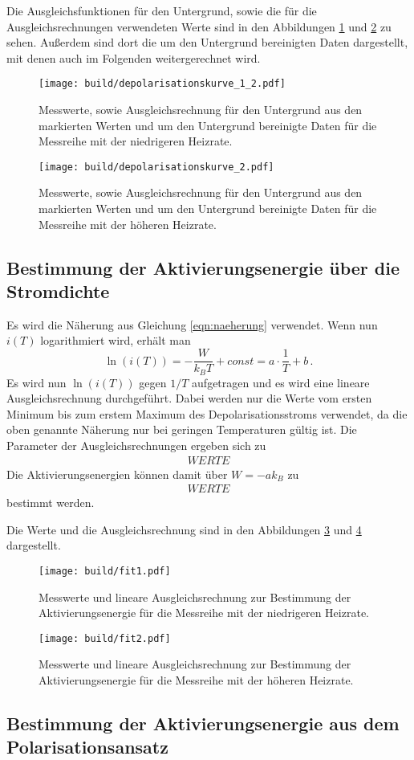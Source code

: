 Die Ausgleichsfunktionen für den Untergrund, sowie die für die Ausgleichsrechnungen
verwendeten Werte sind in den Abbildungen \ref{fig:depol1} und \ref{fig:depol2} zu sehen.
Außerdem sind dort die um den Untergrund bereinigten Daten dargestellt, mit denen auch
im Folgenden weitergerechnet wird.

\begin{figure}
  \centering
  \texttt{[image: build/depolarisationskurve\_1\_2.pdf]}
  \caption{Messwerte, sowie Ausgleichsrechnung für den Untergrund aus den markierten Werten
  und um den Untergrund bereinigte Daten für die Messreihe mit der niedrigeren Heizrate.}
  \label{fig:depol1}
\end{figure}
\begin{figure}
  \centering
  \texttt{[image: build/depolarisationskurve\_2.pdf]}
  \caption{Messwerte, sowie Ausgleichsrechnung für den Untergrund aus den markierten Werten
  und um den Untergrund bereinigte Daten für die Messreihe mit der höheren Heizrate.}
  \label{fig:depol2}
\end{figure}

\subsection{Bestimmung der Aktivierungsenergie über die Stromdichte}

Es wird die Näherung aus Gleichung \eqref{eqn:naeherung} verwendet. Wenn nun $i(T)$
logarithmiert wird, erhält man
\begin{equation*}
  \ln(i(T))=-\frac{W}{k_B T} + const =a\cdot \frac{1}{T} +b  \,.
\end{equation*}
Es wird nun $\ln(i(T))$ gegen $1/T$ aufgetragen und es wird eine lineare Ausgleichsrechnung
durchgeführt. Dabei werden nur die Werte vom ersten Minimum bis zum erstem Maximum
des Depolarisationsstroms verwendet, da die oben genannte Näherung nur bei geringen
Temperaturen gültig ist. Die Parameter
der Ausgleichsrechnungen ergeben sich zu
\begin{align*}
  WERTE
\end{align*}
Die Aktivierungsenergien können damit über $W=-ak_B$ zu
\begin{align*}
 WERTE
\end{align*}
bestimmt werden.

Die Werte und die Ausgleichsrechnung sind in den Abbildungen \ref{fig:fit1} und
\ref{fig:fit2} dargestellt.

\begin{figure}
  \centering
  \texttt{[image: build/fit1.pdf]}
  \caption{Messwerte und lineare Ausgleichsrechnung zur Bestimmung der Aktivierungsenergie für
  die Messreihe mit der niedrigeren Heizrate.}
  \label{fig:fit1}
\end{figure}
\begin{figure}
  \centering
  \texttt{[image: build/fit2.pdf]}
  \caption{Messwerte und lineare Ausgleichsrechnung zur Bestimmung der Aktivierungsenergie für
  die Messreihe mit der höheren Heizrate.}
  \label{fig:fit2}
\end{figure}

\subsection{Bestimmung der Aktivierungsenergie aus dem Polarisationsansatz}
